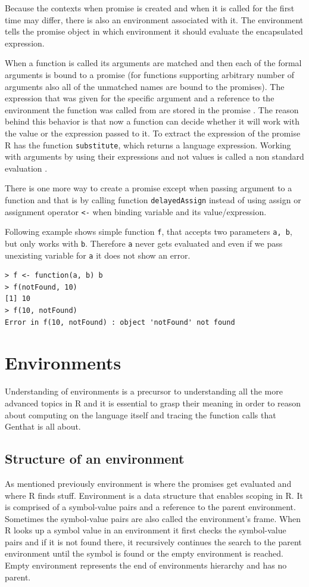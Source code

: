 \documentclass[thesis=B,english]{FITthesis}[2012/10/20]
\begin{document}
Because the contexts when promise is created and when it is called for the first time may differ, there is also an environment associated with it. The environment tells the promise object in which environment it should evaluate the encapsulated expression.

When a function is called its arguments are matched and then each of the formal arguments is bound to a promise (for functions supporting arbitrary number of arguments also all of the unmatched names are bound to the promises). The expression that was given for the specific argument and a reference to the environment the function was called from are stored in the promise \cite{specs}. The reason behind this behavior is that now a function can decide whether it will work with the value or the expression passed to it. To extract the expression of the promise R has the function \verb|substitute|, which returns a language expression. Working with arguments by using their expressions and not values is called a non standard evaluation \cite{advR}.

There is one more way to create a promise except when passing argument to a function and that is by calling function \verb|delayedAssign| instead of using assign or assignment operator \verb|<-| when binding variable and its value/expression.

Following example shows simple function \verb|f|, that accepts two parameters \verb|a, b|, but only works with \verb|b|. Therefore \verb|a| never gets evaluated and even if we pass unexisting variable for \verb|a| it does not show an error.

\begin{verbatim}
> f <- function(a, b) b
> f(notFound, 10)
[1] 10
> f(10, notFound)
Error in f(10, notFound) : object 'notFound' not found
\end{verbatim}

\section{Environments}
Understanding of environments is a precursor to understanding all the more advanced topics in R and it is essential to grasp their meaning in order to reason about computing on the language itself and tracing the function calls that Genthat is all about.

\subsection{Structure of an environment}
As mentioned previously environment is where the promises get evaluated and where R finds stuff. Environment is a data structure that enables scoping in R. It is comprised of a symbol-value pairs and a reference to the parent environment. Sometimes the symbol-value pairs are also called the environment’s frame. When R looks up a symbol value in an environment it first checks the symbol-value pairs and if it is not found there, it recursively continues the search to the parent environment until the symbol is found or the empty environment is reached. Empty environment represents the end of environments hierarchy and has no parent.
\end{document}
